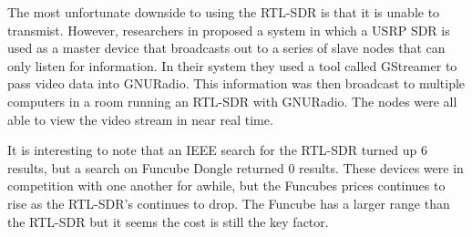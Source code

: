 	The most unfortunate downside to using the RTL-SDR is that it is unable to transmist. However, researchers in \cite{6922233}
	proposed a system in which a USRP SDR is used as a master device that broadcasts out to a series of slave nodes that can
	only listen for information. In their system they used a tool called GStreamer to pass video data into GNURadio. This
	information was then broadcast to multiple computers in a room running an RTL-SDR with GNURadio. The nodes were all able
	to view the video stream in near real time.  

	It is interesting to note that an IEEE search for the RTL-SDR turned up 6 results, but a search on Funcube Dongle returned
	0 results. These devices were in competition with one another for awhile, but the Funcubes prices continues to rise
	as the RTL-SDR's continues to drop. The Funcube has a larger range than the RTL-SDR but it seems the cost is still
	the key factor. 


